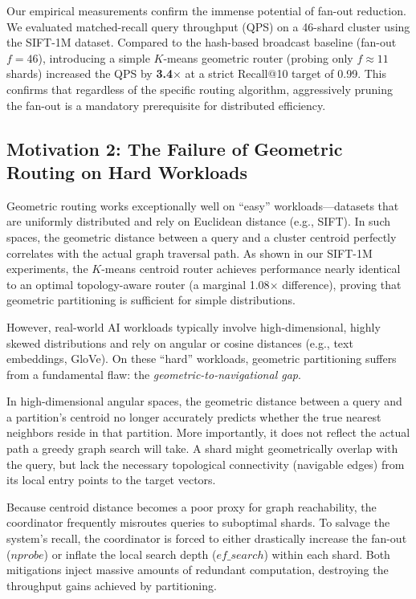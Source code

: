 Our empirical measurements confirm the immense potential of fan-out reduction. We evaluated matched-recall query throughput (QPS) on a 46-shard cluster using the SIFT-1M dataset. Compared to the hash-based broadcast baseline (fan-out $f=46$), introducing a simple $K$-means geometric router (probing only $f \approx 11$ shards) increased the QPS by \textbf{3.4$\times$} at a strict Recall@10 target of 0.99. This confirms that regardless of the specific routing algorithm, aggressively pruning the fan-out is a mandatory prerequisite for distributed efficiency.

\subsection{Motivation 2: The Failure of Geometric Routing on Hard Workloads}
\label{subsec:motivation_failure}

Geometric routing works exceptionally well on ``easy'' workloads---datasets that are uniformly distributed and rely on Euclidean distance (e.g., SIFT). In such spaces, the geometric distance between a query and a cluster centroid perfectly correlates with the actual graph traversal path. As shown in our SIFT-1M experiments, the $K$-means centroid router achieves performance nearly identical to an optimal topology-aware router (a marginal 1.08$\times$ difference), proving that geometric partitioning is sufficient for simple distributions.

However, real-world AI workloads typically involve high-dimensional, highly skewed distributions and rely on angular or cosine distances (e.g., text embeddings, GloVe). On these ``hard'' workloads, geometric partitioning suffers from a fundamental flaw: the \textit{geometric-to-navigational gap}. 

In high-dimensional angular spaces, the geometric distance between a query and a partition's centroid no longer accurately predicts whether the true nearest neighbors reside in that partition. More importantly, it does not reflect the actual path a greedy graph search will take. A shard might geometrically overlap with the query, but lack the necessary topological connectivity (navigable edges) from its local entry points to the target vectors. 

Because centroid distance becomes a poor proxy for graph reachability, the coordinator frequently misroutes queries to suboptimal shards. To salvage the system's recall, the coordinator is forced to either drastically increase the fan-out ($nprobe$) or inflate the local search depth ($ef\_search$) within each shard. Both mitigations inject massive amounts of redundant computation, destroying the throughput gains achieved by partitioning.

